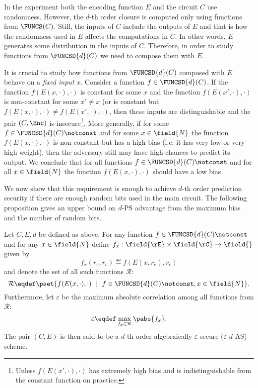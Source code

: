 
In the experiment both the encoding function $E$ and the circuit $C$ use randomness. However, the $d$-th order closure is computed only using functions from $\FUNCS(C)$. Still, the inputs of $C$ include the outputs of $E$ and that is how the randomness used in $E$ affects the computations in $C$. In other words, $E$ generates some distribution in the inputs of $C$. Therefore, in order to study functions from $\FUNCSD{d}(C)$ we need to compose them with $E$.

It is crucial to study how functions from $\FUNCSD{d}(C)$ composed with $E$ behave on a \emph{fixed input} $x$. Consider a function $f \in \FUNCSD{d}(C)$. If the function $f(E(x,\cdot),\cdot)$ is constant for some $x$ and the function $f(E(x',\cdot),\cdot)$ is non-constant for some $x'\ne x$ (or is constant but $f(E(x,\cdot),\cdot) \ne f(E(x',\cdot),\cdot)$, then these inputs are distinguishable and the pair $(C,\Enc)$ is insecure\footnote{Unless $f(E(x',\cdot),\cdot)$ has extremely high bias and is indistinguishable from the constant function on practice.}.
More generally, if for some $f \in \FUNCSD{d}(C)\notconst$ and for some $x \in \field{N}$ the function $f(E(x,\cdot),\cdot)$ is non-constant but has a high bias (i.e. it has very low or very high weight), then the adversary still may have high chances to predict its output. We conclude that for all functions $f \in \FUNCSD{d}(C)\notconst$ and for all $x\in \field{N}$ the function $f(E(x,\cdot),\cdot)$ should have a low bias.

We now show that this requirement is enough to achieve $d$-th order prediction security if there are enough random bits used in the main circuit. The following proposition gives an upper bound on $d$-PS advantage from the maximum bias and the number of random bits.

\newcommand\FF{\mathcal{R}}
\newcommand\maxcor{\varepsilon}

\begin{definition}
Let $C, E, d$ be defined as above.
For any function $f \in \FUNCSD{d}(C)\notconst$ and for any $x \in \field{N}$ define $f_x: \field{\rE}\times\field{\rC} \to \field{}$ given by
$$
f_x(r_e, r_c) \eqdef f(E(x, r_e), r_c)
$$
and denote the set of all such functions $\FF$:
$$
\FF \eqdef \pset{ f(E(x,\cdot),\cdot) ~\mid~ f \in \FUNCSD{d}(C)\notconst, x \in \field{N}}.
$$
Furthermore, let $\maxcor$ be the maximum absolute correlation among all functions from $\FF$:
$$
\maxcor \eqdef \max_{f_x \in \FF} \pabs{f_x}.
$$
The pair $(C,E)$ is then said to be a $d$-th order algebraically $\maxcor$-secure ($\maxcor$-$d$-AS) scheme.
\end{definition}




